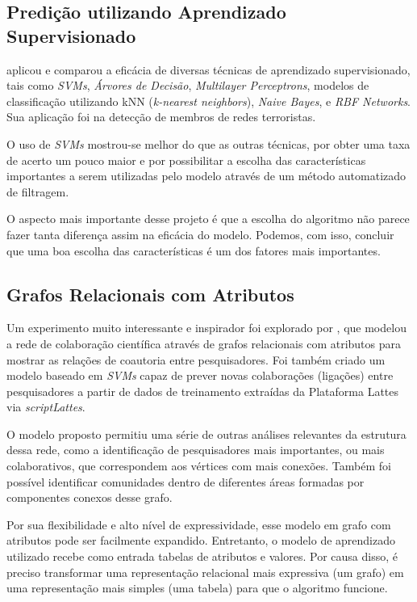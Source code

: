 \subsection{Predição utilizando Aprendizado Supervisionado}
\label{ssec:graphs-with-attributes}

\citet{MohammadAlHasan} aplicou e comparou a eficácia de diversas técnicas de aprendizado supervisionado, tais como \textit{SVMs}, \textit{Árvores de Decisão}, \textit{Multilayer Perceptrons}, modelos de classificação utilizando kNN (\textit{k-nearest neighbors}), \textit{Naive Bayes}, e \textit{RBF Networks}. Sua aplicação foi na detecção de membros de redes terroristas.

O uso de \textit{SVMs} mostrou-se melhor do que as outras técnicas, por obter uma taxa de acerto um pouco maior e por possibilitar a escolha das características importantes a serem utilizadas pelo modelo através de um método automatizado de filtragem.

O aspecto mais importante desse projeto é que a escolha do algoritmo não parece fazer tanta diferença assim na eficácia do modelo. Podemos, com isso, concluir que uma boa escolha das características é um dos fatores mais importantes.


\subsection{Grafos Relacionais com Atributos}
\label{ssec:graphs-with-attributes}

Um experimento muito interessante e inspirador foi explorado por \citet{Cervantes2014}, que modelou a rede de colaboração científica através de grafos relacionais com atributos para mostrar as relações de coautoria entre pesquisadores. Foi também criado um modelo baseado em \textit{SVMs} capaz de prever novas colaborações (ligações) entre pesquisadores a partir de dados de treinamento extraídas da Plataforma Lattes via \textit{scriptLattes}.

O modelo proposto permitiu uma série de outras análises relevantes da estrutura dessa rede, como a identificação de pesquisadores mais importantes, ou mais colaborativos, que correspondem aos vértices com mais conexões. Também foi possível identificar comunidades dentro de diferentes áreas formadas por componentes conexos desse grafo.

Por sua flexibilidade e alto nível de expressividade, esse modelo em grafo com atributos pode ser facilmente expandido. Entretanto, o modelo de aprendizado utilizado recebe como entrada tabelas de atributos e valores. Por causa disso, é preciso transformar uma representação relacional mais expressiva (um grafo) em uma representação mais simples (uma tabela) para que o algoritmo funcione.

